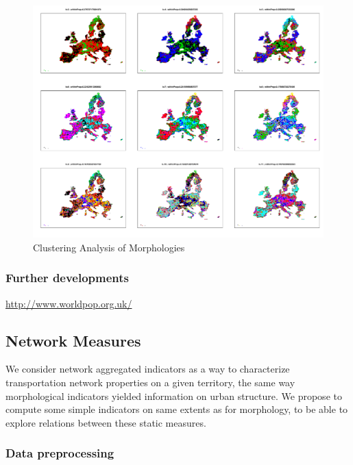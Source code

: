 \begin{figure}
\hspace{-3cm}
\includegraphics[angle=90,width=1.7\textwidth,height=\textheight]{Figures/PartII/Empirical/Static/Density/clust_k3-11}
\caption[Clustering Analysis of Morphologies]{Clustering Analysis of Morphologies}
\end{figure}






\subsubsection{Further developments}

\cite{10.1371/journal.pone.0107042}

\url{http://www.worldpop.org.uk/}



\subsection{Network Measures}

We consider network aggregated indicators as a way to characterize transportation network properties on a given territory, the same way morphological indicators yielded information on urban structure. We propose to compute some simple indicators on same extents as for morphology, to be able to explore relations between these static measures.

\subsubsection{Data preprocessing}

